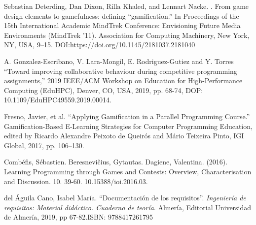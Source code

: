 \documentclass[11pt,spanish,listoffigures,listoftables]{tfgetsinf}
\begin{document}
\begin{thebibliography}{10}



	 Sebastian Deterding, Dan Dixon, Rilla Khaled, and Lennart Nacke. 
	 . From game design elements to gamefulness: defining ``gamification.'' In Proceedings of the 15th International Academic MindTrek Conference: Envisioning Future Media Environments (MindTrek ’11). Association for Computing Machinery, New York, NY, USA, 9–15. DOI:https://doi.org/10.1145/2181037.2181040
	 
	A. Gonzalez-Escribano, V. Lara-Mongil, E. Rodriguez-Gutiez and Y. Torres
	\newblock ``Toward improving collaborative behaviour during competitive programming assignments,'' 2019 IEEE/ACM Workshop on Education for High-Performance Computing (EduHPC), Denver, CO, USA, 2019, pp. 68-74, DOP: 10.1109/EduHPC49559.2019.00014.

	Fresno, Javier, et al. 
	\newblock ``Applying Gamification in a Parallel Programming Course.'' Gamification-Based E-Learning Strategies for Computer Programming Education, edited by Ricardo Alexandre Peixoto de Queirós and Mário Teixeira Pinto, IGI Global, 2017, pp. 106–130.

	Combéfis, Sébastien. Beresnevičius, Gytautas. Dagiene, Valentina. (2016). 
	\newblock Learning Programming through Games and Contests: Overview, Characterisation and Discussion. 10. 39-60. 10.15388/ioi.2016.03. 
	
	
	del Águila Cano, Isabel María.
	\newblock ``Documentación de los requisitos''. \textit{Ingeniería de requisitos: Material didáctico. Cuaderno de teoría}.
	\newblock Almería, Editorial Universidad de Almería, 2019, pp 67-82.ISBN: 9788417261795


\end{thebibliography}
\end{document}
